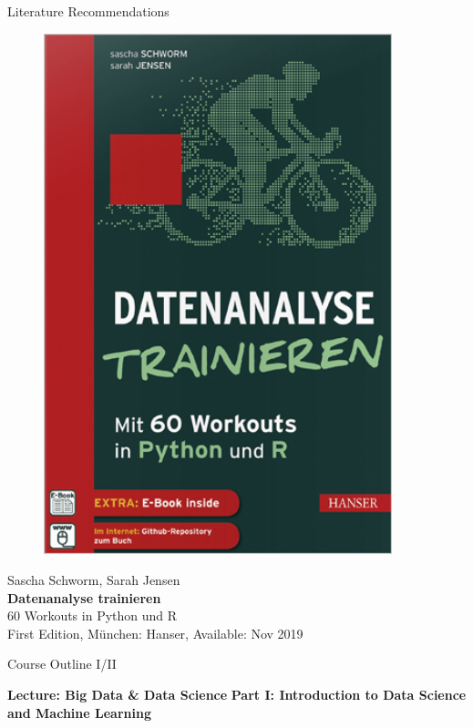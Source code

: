 \documentclass[main.tex]{subfiles}
\begin{document}
\begin{frame}{Literature Recommendations}
\begin{minipage}{0.1\textwidth}
\begin{figure}[H]
                \includegraphics[height=0.2\textheight, width=0.9\textwidth, left]{assets/book-covers/schworm2019.jpg}
            \end{figure}
        \end{minipage}
        \begin{minipage}{0.39\textwidth}
            \footnotesize Sascha Schworm, Sarah Jensen \normalsize \\[-0.5mm]
            \small \textbf{Datenanalyse trainieren} \\[-0.8mm]
            60 Workouts in Python und R \normalsize \\
            \tiny First Edition, München: Hanser, Available: Nov 2019 \normalsize
        \end{minipage}
    \end{frame}

    \begin{frame}{Course Outline I/II}
        \begin{minipage}{\textwidth}
            \textbf{Lecture: Big Data \& Data Science}
            \tableofcontents[hideallsubsections]       
            \vspace{8mm}
            \textbf{Part I: Introduction to Data Science and Machine Learning}
            \tableofcontents[hideallsubsections, sections={2-4}, part=1]  
        \end{minipage}
    \end{frame}
\end{document}

